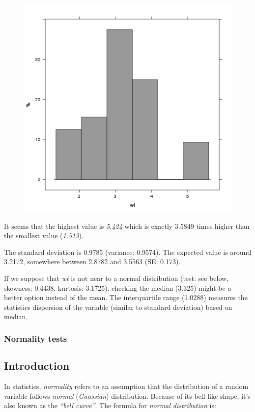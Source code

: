 \documentclass{article}
\makeatletter
\def\maxwidth{\ifdim\Gin@nat@width>\linewidth\linewidth
\else\Gin@nat@width\fi}
\let\Oldincludegraphics\includegraphics
\renewcommand{\includegraphics}[1]{\Oldincludegraphics[width=\maxwidth]{#1}}
\makeatother
\begin{document}
\begin{figure}[htbp]
\centering
\includegraphics{10caa8222b28328a6d8fd28917cbfb45.png}
\caption{}
\end{figure}

It seems that the highest value is \emph{5.424} which is exactly 3.5849
times higher than the smallest value (\emph{1.513}).

The standard deviation is 0.9785 (variance: 0.9574). The expected value
is around 3.2172, somewhere between 2.8782 and 3.5563 (SE: 0.173).

If we suppose that \emph{wt} is not near to a normal distribution (test:
see below, skewness: 0.4438, kurtosis: 3.1725), checking the median
(3.325) might be a better option instead of the mean. The interquartile
range (1.0288) measures the statistics dispersion of the variable
(similar to standard deviation) based on median.

\subsubsection{Normality tests}

\subsection{Introduction}

In statistics, \emph{normality} refers to an assumption that the
distribution of a random variable follows \emph{normal}
(\emph{Gaussian}) distribution. Because of its bell-like shape, it's
also known as the \emph{``bell curve''}. The formula for \emph{normal
distribution} is:
\end{document}
